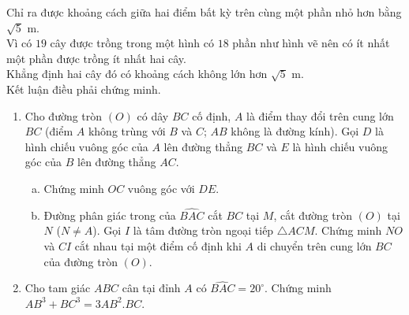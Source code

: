 \begin{ex}
{\begin{enumerate}[1)]
\begin{center}
\end{center}



Chỉ ra được khoảng cách giữa hai điểm bất kỳ trên cùng một phần nhỏ hơn bằng $\sqrt{5}$ m.\\
Vì có $19$ cây được trồng trong một hình có $18$ phần như hình vẽ nên có ít nhất một phần được trồng ít nhất hai cây. \\
Khẳng định hai cây đó có khoảng cách không lớn hơn $\sqrt{5}$ m.\\
Kết luận điều phải chứng minh. 
\end{enumerate}
}
\end{ex}

\begin{ex}%
 \hfill 
\begin{enumerate}[1)]
\item Cho đường tròn $(O)$ có dây $BC$ cố định, $A$ là điểm thay đổi trên cung lớn $BC$ (điểm $A$ không trùng với $B$ và $C$; $AB$ không là đường kính). Gọi $D$ là hình chiếu vuông góc của $A$ lên đường thẳng $BC$ và $E$ là hình chiếu vuông góc của $B$ lên đường thẳng $AC$. 
\begin{enumerate}[a)]
\item Chứng minh $OC$ vuông góc với $DE$. 
\item Đường phân giác trong của $\widehat{BAC}$ cắt $BC$ tại $M$, cắt đường tròn $(O)$ tại $N$ ($N \ne A$). Gọi $I$ là tâm đường tròn ngoại tiếp $\triangle ACM$. Chứng minh $NO$ và $CI$ cắt nhau tại một điểm cố định khi $A$ di chuyển trên cung lớn $BC$ của đường tròn $(O)$. 
\end{enumerate}
\item Cho tam giác $ABC$ cân tại đỉnh $A$ có $\widehat{BAC}=20^\circ$. Chứng minh $AB^3+BC^3=3AB^2. BC$.
\end{enumerate}


\end{ex}
